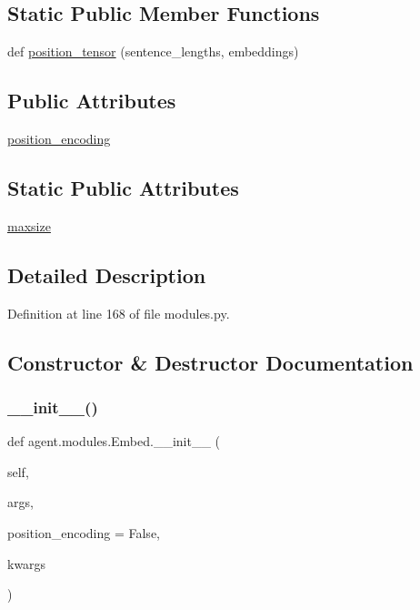 \subsection*{Static Public Member Functions}
\begin{DoxyCompactItemize}
\item 
def \hyperlink{classagent_1_1modules_1_1Embed_a4a33beb3367c08f94bac7b5076cbf96d}{position\+\_\+tensor} (sentence\+\_\+lengths, embeddings)
\end{DoxyCompactItemize}
\subsection*{Public Attributes}
\begin{DoxyCompactItemize}
\item 
\hyperlink{classagent_1_1modules_1_1Embed_a482a481bdc736280d0af174a15f6e8ee}{position\+\_\+encoding}
\end{DoxyCompactItemize}
\subsection*{Static Public Attributes}
\begin{DoxyCompactItemize}
\item 
\hyperlink{classagent_1_1modules_1_1Embed_ae5f6b225f9a03fbac3ff2fb91b88ca91}{maxsize}
\end{DoxyCompactItemize}


\subsection{Detailed Description}


Definition at line 168 of file modules.\+py.



\subsection{Constructor \& Destructor Documentation}
\mbox{\label{classagent_1_1modules_1_1Embed_aeb8a118bbca535fb35d6b5a45c2603c2}} 
\subsubsection{\texorpdfstring{\+\_\+\+\_\+init\+\_\+\+\_\+()}{\_\_init\_\_()}}
{\footnotesize\ttfamily def agent.\+modules.\+Embed.\+\_\+\+\_\+init\+\_\+\+\_\+ (\begin{DoxyParamCaption}\item[{}]{self,  }\item[{}]{args,  }\item[{}]{position\+\_\+encoding = {\ttfamily False},  }\item[{}]{kwargs }\end{DoxyParamCaption})}



